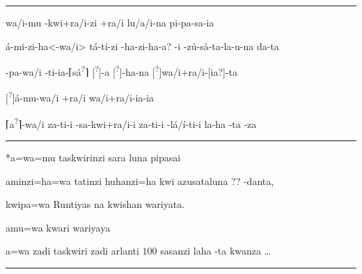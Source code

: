 \vspace{10pt}
\hrule
\vspace{10pt}

\setcounter{parcount}{8}
\begin{parnumbersa}[]

	\raggedright%
	\itshape%

	\lmasc{}wa/i-mu
	\lmasc{}-kwi+ra/i-zi +ra/i
	\lmasc{}lu\logo/a/i-na
	\lmasc{}pi-pa-sa-ia


	\lmasc{}á-mi-zi-ha<-wa/i>
	\lmasc{}tá-ti-zi
	\lbreak{} -ha-zi-ha-a?
	\lmasc{}-i
	-zú-sà-ta-la-u-na
	da-ta


	\lmasc{}-pa-wa/i
	-ti-ia-\textsc{⌈}sá\textsuperscript{?}\textsc{⌉} $[$\lmasc{}\textsuperscript{?}$]$-a
	$[$\lmasc{}\textsuperscript{?}$]$-ha-na
	$[$\lmasc{}\textsuperscript{?}$]$wa/i+ra/i-[ia?]-ta

	$[$\lmasc{}\textsuperscript{?}$]$á-mu-wa/i
	\lmasc{}+ra/i
	\lmasc{}wa/i+ra/i-ia-ia


	\lmasc{}\textsc{⌈}a\textsuperscript{?}\textsc{⌉}-wa/i
	\lmasc{}za-ti-i
	\lmasc{}-sa-kwi+ra/i-i
	\lmasc{}za-ti-i
	\lmasc{}-lá/í-ti-i   la-ha
	-ta
	\lmasc{}-za


\end{parnumbersa}

\vspace{10pt}
\hrule
\vspace{10pt}


\setcounter{parcount}{8}
\begin{parnumbersa}[]

	\raggedright%
	\itshape%

	*a=wa=mu taskwirinzi sara luna pipasai

	aminzi=ha=wa tatinzi huhanzi=ha kwi azusataluna {??}
	-danta,

	kwipa=wa Runtiyas na kwishan wariyata.

	amu=wa kwari wariyaya

	a=wa zadi taskwiri zadi arlanti $100$ sasanzi laha -ta kwanza \ldots{}

\end{parnumbersa}

\vspace{10pt}
\hrule


